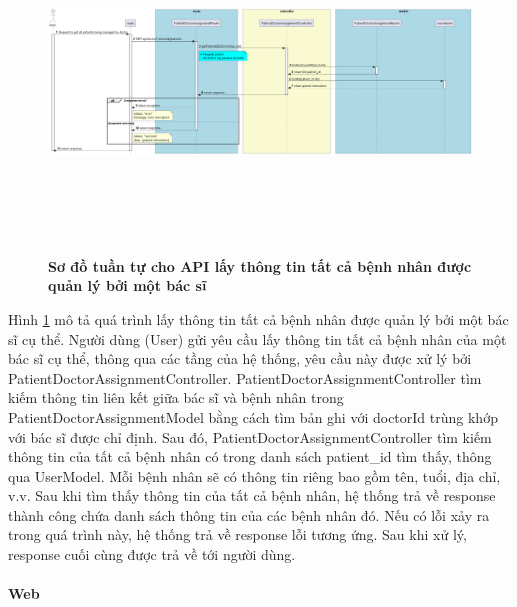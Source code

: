 \begin{figure}[H]
  \centering
  \includegraphics[width=16cm,height=9cm]{Images/server/sequence/server/getPatientsByDoctor.png}
  \caption[Sơ đồ tuần tự cho API lấy thông tin tất cả bệnh nhân được quản lý bởi một bác sĩ]{\bfseries \fontsize{12pt}{0pt}
  \selectfont Sơ đồ tuần tự cho API lấy thông tin tất cả bệnh nhân được quản lý bởi một bác sĩ }
  \label{getPatientsByDoctor} %
\end{figure}
Hình \ref{getPatientsByDoctor}  mô tả quá trình lấy thông tin tất cả bệnh nhân được quản lý bởi một bác sĩ cụ thể. Người dùng (User) gửi yêu cầu lấy thông tin tất cả bệnh nhân của một bác sĩ cụ thể, thông qua các tầng của hệ thống, yêu cầu này được xử lý bởi PatientDoctorAssignmentController. PatientDoctorAssignmentController tìm kiếm thông tin liên kết giữa bác sĩ và bệnh nhân trong PatientDoctorAssignmentModel bằng cách tìm bản ghi với doctorId trùng khớp với bác sĩ được chỉ định. Sau đó, PatientDoctorAssignmentController tìm kiếm thông tin của tất cả bệnh nhân có trong danh sách patient\_id tìm thấy, thông qua UserModel. Mỗi bệnh nhân sẽ có thông tin riêng bao gồm tên, tuổi, địa chỉ, v.v. Sau khi tìm thấy thông tin của tất cả bệnh nhân, hệ thống trả về response thành công chứa danh sách thông tin của các bệnh nhân đó. Nếu có lỗi xảy ra trong quá trình này, hệ thống trả về response lỗi tương ứng. Sau khi xử lý, response cuối cùng được trả về tới người dùng.



\paragraph{Web}
\mbox{}


